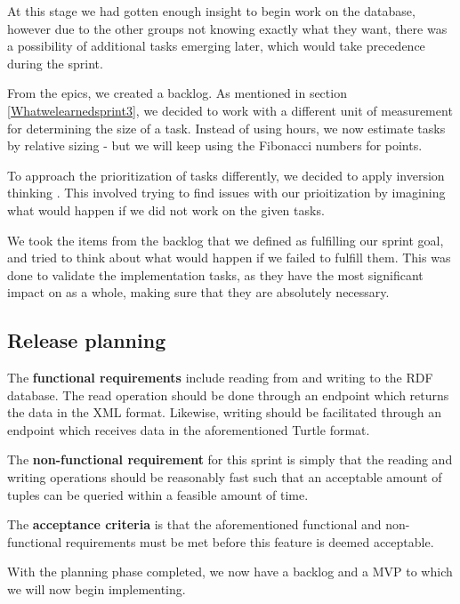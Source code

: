 At this stage we had gotten enough insight to begin work on the database, however due to the other groups not knowing exactly what they want, there was a possibility of additional tasks emerging later, which would take precedence during the sprint.


From the epics, we created a backlog. As mentioned in section \ref{Whatwelearnedsprint3}, we decided to work with a different unit of measurement for determining the size of a task.
Instead of using hours, we now estimate tasks by relative sizing - but we will keep using the Fibonacci numbers for points.

To approach the prioritization of tasks differently, we decided to apply inversion thinking \cite{InversionThinking}. This involved trying to find issues with our prioitization by imagining what would happen if we did not work on the given tasks. 

We took the items from the backlog that we defined as fulfilling our sprint goal, and tried to think about what would happen if we failed to fulfill them. 
This was done to validate the implementation tasks, as they have the most significant impact on \knox{} as a whole, making sure that they are absolutely necessary. 

\subsection*{Release planning}\label{acceptCriteriaSprint5}
The \textbf{functional requirements} include reading from and writing to the RDF database. 
The read operation should be done through an endpoint which returns the data in the XML format.
Likewise, writing should be facilitated through an endpoint which receives data in the aforementioned Turtle format.


The \textbf{non-functional requirement} for this sprint is simply that the reading and writing operations should be reasonably fast such that an acceptable amount of tuples can be queried within a feasible amount of time.


The \textbf{acceptance criteria} is that the aforementioned functional and non-functional requirements must be met before this feature is deemed acceptable. 


With the planning phase completed, we now have a backlog and a MVP to which we will now begin implementing.